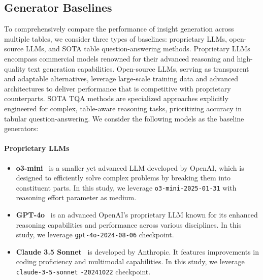 \subsection{Generator Baselines}
\label{apx:gen_base}
To comprehensively compare the performance of insight generation across multiple tables, we consider three types of baselines: proprietary LLMs, open-source LLMs, and SOTA table question-answering methods. 
Proprietary LLMs encompass commercial models renowned for their advanced reasoning and high-quality text generation capabilities. Open-source LLMs, serving as transparent and adaptable alternatives, leverage large-scale training data and advanced architectures to deliver performance that is competitive with proprietary counterparts. SOTA TQA methods are specialized approaches explicitly engineered for complex, table-aware reasoning tasks, prioritizing accuracy in tabular question-answering. 
We consider the following models as the baseline generators: 

\paragraph{Proprietary LLMs}
\begin{itemize}[leftmargin=*,topsep=4pt,itemsep=4pt,parsep=0pt]

    \item\textbf{o3-mini}~\citep{O3mini} is a smaller yet advanced LLM developed by OpenAI, which is designed to efficiently solve complex problems by breaking them into constituent parts.
    In this study, we leverage \texttt{o3-mini-2025-01-31} with reasoning effort parameter as medium.

    \item\textbf{GPT-4o}~\citep{GPT4o} is an advanced OpenAI's proprietary LLM known for its enhanced reasoning capabilities and performance across various disciplines.
    In this study, we leverage \texttt{gpt-4o-2024-08-06} checkpoint.

    \item\textbf{Claude 3.5 Sonnet}~\citep{Claude3S} is developed by Anthropic.
    It features improvements in coding proficiency and multimodal capabilities.
    In this study, we leverage \texttt{claude-3-5-sonnet} \texttt{-20241022} checkpoint.

\end{itemize}

